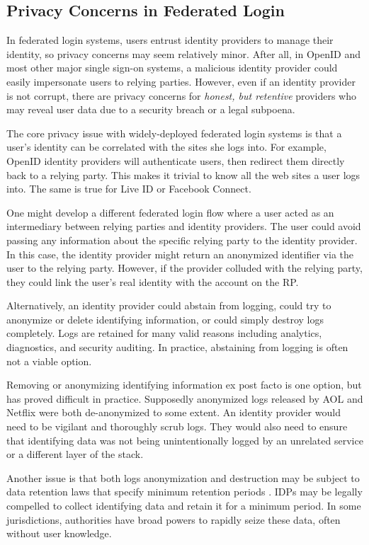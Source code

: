\documentclass{llncs}
\begin{document}
\subsection{Privacy Concerns in Federated Login}

In federated login systems, users entrust identity providers to manage
their identity, so privacy concerns may seem relatively minor. After
all, in OpenID and most other major single sign-on systems, a
malicious identity provider could easily impersonate users to relying
parties. However, even if an identity provider is not corrupt, there
are privacy concerns for \emph{honest, but retentive} providers who
may reveal user data due to a security breach or a legal subpoena.

The core privacy issue with widely-deployed federated login systems is
that a user's identity can be correlated with the sites she logs
into. For example, OpenID identity providers will authenticate users,
then redirect them directly back to a relying party. This makes it
trivial to know all the web sites a user logs into. The same is true
for Live ID or Facebook Connect.

One might develop a different federated login flow where a user acted
as an intermediary between relying parties and identity providers. The
user could avoid passing any information about the specific relying
party to the identity provider. In this case, the identity provider
might return an anonymized identifier via the user to the relying
party. However, if the provider colluded with the relying party, they
could link the user's real identity with the account on the RP.

Alternatively, an identity provider could abstain from logging, could
try to anonymize or delete identifying information, or could simply
destroy logs completely. Logs are retained for many valid reasons
including analytics, diagnostics, and security auditing. In practice,
abstaining from logging is often not a viable option.

Removing or anonymizing identifying information ex post facto is one
option, but has proved difficult in practice. Supposedly anonymized
logs released by AOL \cite{BarZel06} and Netflix \cite{NaSh08} were
both de-anonymized to some extent. An identity provider would need to
be vigilant and thoroughly scrub logs. They would also need to ensure
that identifying data was not being unintentionally logged by an
unrelated service or a different layer of the stack.

Another issue is that both logs anonymization and destruction may be
subject to data retention laws that specify minimum retention periods
\cite{EUDir}. IDPs may be legally compelled to collect identifying
data and retain it for a minimum period. In some jurisdictions,
authorities have broad powers to rapidly seize these data, often
without user knowledge.
\end{document}
